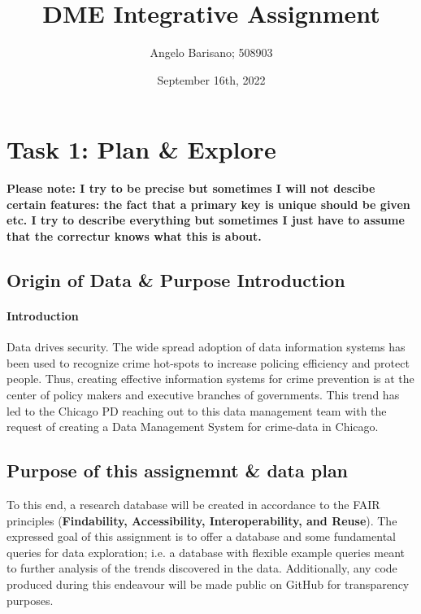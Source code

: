 \documentclass[a4paper]{article}
\begin{document}
\title{DME Integrative Assignment}
\author{Angelo Barisano; 508903 }
\date{September 16th, 2022}
\maketitle

\newpage




\section{Task 1: Plan \& Explore}


\textbf{Please note: I try to be precise but sometimes I will not descibe certain features: the fact that a primary key is unique should be given etc. I try to describe everything but sometimes I just have to assume that the correctur knows what this is about. }

\subsection{Origin of Data \& Purpose Introduction}
\paragraph{Introduction} Data drives security. The wide spread adoption of data information systems has been used to recognize crime hot-spots to increase policing efficiency and protect people. Thus, creating effective information systems for crime prevention is at the center of policy makers and executive branches of governments. This trend has led to the Chicago PD reaching out to this data management team with the request of creating a Data Management System for crime-data in Chicago.

\subsection{Purpose of this assignemnt \& data plan}

To this end, a research database will be created in accordance to the FAIR principles (\textbf{Findability, Accessibility, Interoperability, and Reuse}). The expressed goal of this assignment is to offer a database and some fundamental queries for data exploration; i.e. a database with flexible example queries meant to further analysis of the trends discovered in the data. Additionally, any code produced during this endeavour will be made public on GitHub for transparency purposes. 
\end{document}
